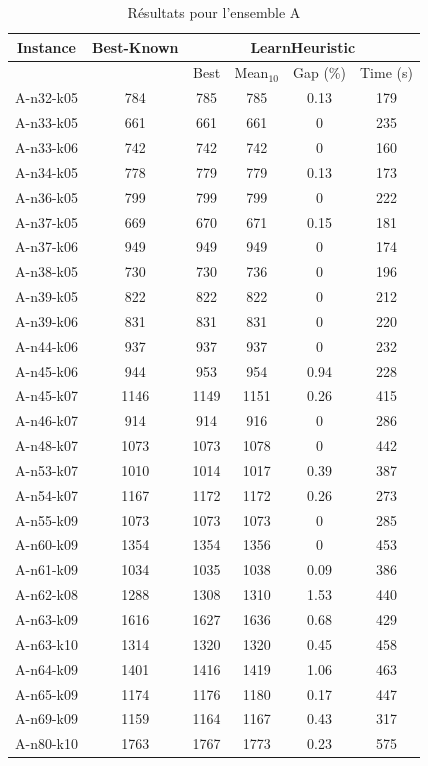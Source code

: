 \documentclass[a4paper,11pt]{article}%
\begin{document}
\begin{table}[h!]
\caption{Résultats pour l'ensemble A}
\label{TA}
\begin{center}
\begin{tabular}{|@{}c@{}|@{}c@{}|@{}c@{}|@{}c@{}|@{}c@{}|@{}c@{}|}

\hline
 Instance & Best-Known & \multicolumn{4}{c|}{LearnHeuristic}  \\
 \hline
 & & Best & Mean$_{10}$ & Gap (\%) & Time (s) \\ 
 \hline
 A-n32-k05 & 784 & 785 & 785 & 0.13 & 179  \\
 \hline
 A-n33-k05   & 661 & 661 & 661 &0 & 235   \\
  \hline
   A-n33-k06 & 742 & 742 & 742 &0 & 160  \\
 \hline
   A-n34-k05 & 778 & 779 & 779 &0.13 & 173  \\
  \hline
   A-n36-k05 & 799 & 799 & 799 & 0 & 222  \\
 \hline
  A-n37-k05  & 669 & 670 & 671 & 0.15 & 181  \\
  \hline
  A-n37-k06 & 949 & 949 & 949 & 0 & 174 \\
 \hline
  A-n38-k05  & 730 & 730 & 736 & 0 & 196 \\
 \hline
 A-n39-k05 & 822 & 822 & 822 & 0 & 212 \\
 \hline
  A-n39-k06  & 831 & 831 & 831 & 0 & 220   \\
 \hline
   A-n44-k06 & 937 & 937 & 937 & 0 & 232   \\
  \hline
   A-n45-k06 & 944 & 953 & 954 & 0.94 & 228  \\
 \hline 
  A-n45-k07  & 1146 & 1149 & 1151 & 0.26 & 415 \\
  \hline
  A-n46-k07  & 914 & 914 & 916 &0 & 286  \\
  \hline
  A-n48-k07 & 1073 & 1073 & 1078 &0 & 442  \\
 \hline
  A-n53-k07  & 1010 & 1014 & 1017 &0.39 & 387   \\
  \hline
  A-n54-k07  & 1167 & 1172 & 1172 & 0.26 & 273  \\
  \hline
  A-n55-k09 & 1073 & 1073 & 1073 &0 & 285  \\
 \hline 
   A-n60-k09 & 1354 & 1354 & 1356 &0 & 453   \\
  \hline 
  A-n61-k09  & 1034 & 1035 & 1038 &0.09 & 386  \\
  \hline
    A-n62-k08  & 1288 & 1308  & 1310 &1.53 & 440   \\
  \hline
    A-n63-k09  & 1616 & 1627 & 1636 &0.68 & 429   \\
  \hline
    A-n63-k10  & 1314 & 1320 &1320 &0.45 & 458   \\
  \hline
    A-n64-k09  & 1401 & 1416 & 1419 &1.06 & 463   \\
  \hline
    A-n65-k09  & 1174 & 1176 & 1180 &0.17 & 447   \\
  \hline
    A-n69-k09  & 1159 & 1164 & 1167 & 0.43 & 317   \\
  \hline
    A-n80-k10  & 1763 & 1767 & 1773 & 0.23 & 575   \\
  \hline
\end{tabular}
\end{center}
\end{table}
\end{document}
